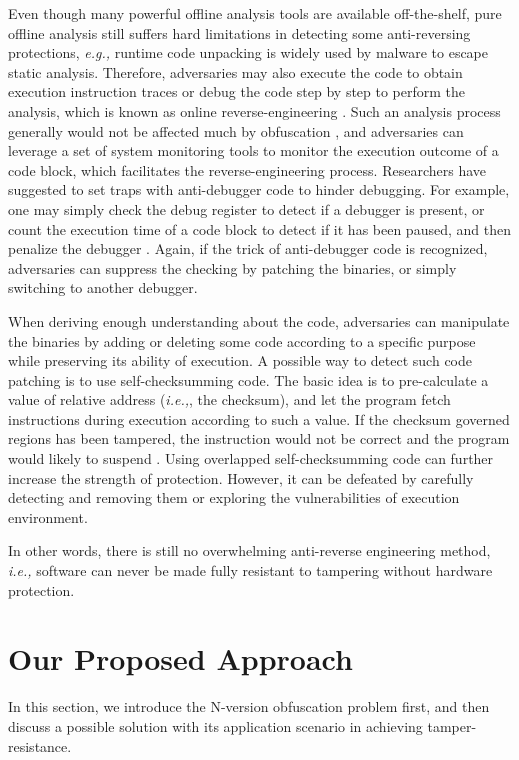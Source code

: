 \documentclass[10pt, conference]{IEEEtran}
\begin{document}
Even though many powerful offline analysis tools are available off-the-shelf, pure offline analysis still suffers hard limitations in detecting some anti-reversing protections, \textit{e.g.,} runtime code unpacking is widely used by malware to escape static analysis.  Therefore, adversaries may also execute the code to obtain execution instruction traces \cite{qiu2015identifying} or debug the code step by step to perform the analysis, which is known as online reverse-engineering \cite{eilam2011reversing}.  Such an analysis process generally would not be affected much by obfuscation \cite{yadegari2015generic}, and adversaries can leverage a set of system monitoring tools to monitor the execution outcome of a code block, which facilitates the reverse-engineering process.  Researchers have suggested to set traps with anti-debugger code to hinder debugging.  For example, one may simply check the debug register to detect if a debugger is present, or count the execution time of a code block to detect if it has been paused, and then penalize the debugger \cite{gagnon2007software,shields2010anti}.  Again, if the trick of anti-debugger code is recognized, adversaries can suppress the checking by patching the binaries, or simply switching to another debugger.  

When deriving enough understanding about the code, adversaries can manipulate the binaries by adding or deleting some code according to a specific purpose while preserving its ability of execution.  A possible way to detect such code patching is to use self-checksumming code.  The basic idea is to pre-calculate a value of relative address (\textit{i.e.,}, the checksum), and let the program fetch instructions during execution according to such a value.  If the checksum governed regions has been tampered, the instruction would not be correct and the program would likely to suspend \cite{wurster2005generic}.  Using overlapped self-checksumming code can further increase the strength of protection.  However, it can be defeated by carefully detecting and removing them \cite{qiu2014framework} or exploring the vulnerabilities \cite{wurster2005generic} of execution environment.

In other words, there is still no overwhelming anti-reverse engineering method, \textit{i.e.,} software can never be made fully resistant to tampering without hardware protection.

\section{Our Proposed Approach} \label{section:approach}
In this section, we introduce the N-version obfuscation problem first, and then discuss a possible solution with its application scenario in achieving tamper-resistance. 
\end{document}
